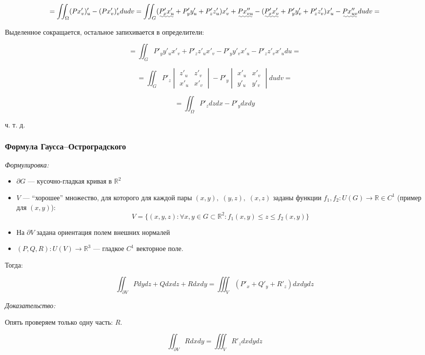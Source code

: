 \documentclass{article}
\def\dbl{\,\,}
\begin{document}
\[ = \iint_{\Omega} (Px'_v)'_u - (Px'_v)'_v dudv = \iint_{G} (\uwave{P'_xx'_u} + P'_yy'_u+ P'_zz'_u)x'_v + \uwave{P x''_{vu}} - (\uwave{P'_xx'_v }+ P'_yy'_v+ P'_zz'_v)x'_u - \uwave{P x''_{uv}} du dv = \]

Выделенное сокращается, остальное запихивается в определители:

\[ = \iint_{G} P'_yy'_ux'_v+ P'_zz'_ux'_v -P'_yy'_vx'_u -P'_zz'_vx'_u du =\]

\[ = \iint_{G} P'_z \begin{vmatrix}
    z'_u & z'_v \\
    x'_u & x'_v
\end{vmatrix}  -P'_y \begin{vmatrix}
    x'_u & x'_v \\
    y'_u & y'_v
\end{vmatrix} du dv =\]

\[ = \iint_{\Omega} P'_z dzdx - P'_ydxdy\]

ч. т. д. 



\subsubsection{Формула Гаусса--Остроградского}
\textit{Формулировка:}

\begin{itemize}
    \item $\partial G$ --- кусочно-гладкая кривая в $\mathbb{R}^2$
    \item $V$ --- ``хорошее'' множество, для которого для каждой пары $(x, y), \dbl (y, z), \dbl (x, z)$ заданы функции $f_1, f_2: U(G) \rightarrow \mathbb{R} \in C^1$ (пример для $(x, y)$):
    \[V = \{(x, y, z): \forall x, y \in G \subset \mathbb{R}^2: f_1(x, y) \le z \le f_2(x, y)\}\]
    \item На $\partial V$ задана ориентация полем внешних нормалей
    \item $(P, Q, R): U(V) \rightarrow \mathbb{R}^3$ --- гладкое $C^1$ векторное поле.
\end{itemize}

Тогда:

\[\iint_{\partial V} Pdydz + Qdxdz + Rdxdy = \iiint_{V} (P'_x + Q'_y + R'_z)dxdydz\]

\textit{Доказательство:}

Опять проверяем только одну часть: $R$.

\[\iint_{\partial V} R dxdy = \iiint_{V} R'_zdxdydz\]
\end{document}
